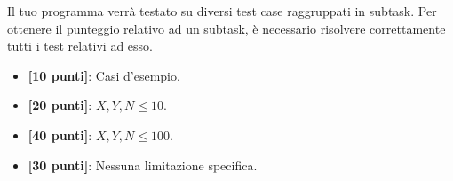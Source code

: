 \Scoring
Il tuo programma verrà testato su diversi test case raggruppati in subtask.
Per ottenere il punteggio relativo ad un subtask, è necessario risolvere
correttamente tutti i test relativi ad esso.

\begin{itemize}[nolistsep,itemsep=2mm]
  \item \textbf{ [10 punti]}: Casi d'esempio.
  \item \textbf{ [20 punti]}: $X, Y, N \le 10$.
  \item \textbf{ [40 punti]}: $X, Y, N \le 100$.
  \item \textbf{ [30 punti]}: Nessuna limitazione specifica.
\end{itemize}

\Examples
\begin{example}
\end{example}
\begin{example}
\end{example}


